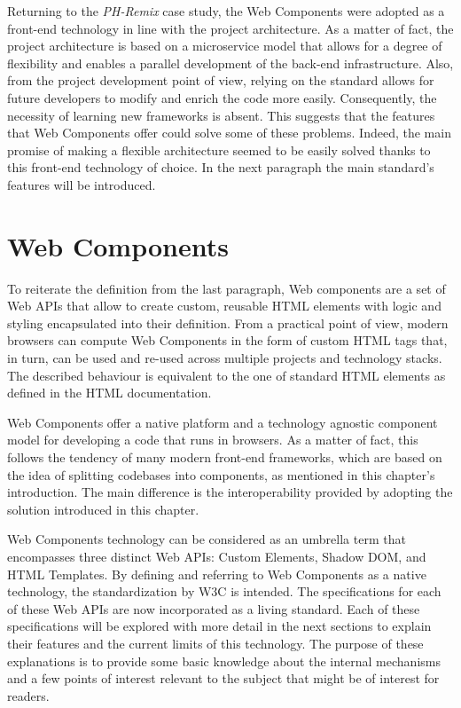 Returning to the \emph{PH-Remix} case study, the Web Components were adopted as a front-end technology in line with the project architecture. As a matter of fact, the project architecture is based on a microservice model that allows for a degree of flexibility and enables a parallel development of the back-end infrastructure. Also, from the project development point of view, relying on the standard allows for future developers to modify and enrich the code more easily. Consequently, the necessity of learning new frameworks is absent. This suggests that the features that Web Components offer could solve some of these problems. Indeed, the main promise of making a flexible architecture seemed to be easily solved thanks to this front-end technology of choice. In the next paragraph the main standard’s features will be introduced. 

\section{Web Components}
\label{sec:webComponents}

To reiterate the definition from the last paragraph, Web components are a set of Web APIs that allow to create custom, reusable HTML elements with logic and styling encapsulated into their definition. From a practical point of view, modern browsers can compute Web Components in the form of custom HTML tags that, in turn, can be used and re-used across multiple projects and technology stacks. The described behaviour is equivalent to the one of standard HTML elements as defined in the HTML documentation.

Web Components offer a native platform and a technology agnostic component model for developing a code that runs in browsers. As a matter of fact, this follows the tendency of many modern front-end frameworks, which are based on the idea of splitting codebases into components, as mentioned in this chapter’s introduction. The main difference is the interoperability provided by adopting the solution introduced in this chapter.

Web Components technology can be considered as an umbrella term that encompasses three distinct Web APIs: Custom Elements, Shadow DOM, and HTML Templates. By defining and referring to Web Components as a native technology, the standardization by W3C is intended. The specifications for each of these Web APIs are now incorporated as a living standard. Each of these specifications will be explored with more detail in the next sections to explain their features and the current limits of this technology. The purpose of these explanations is to provide some basic knowledge about the internal mechanisms and a few points of interest relevant to the subject that might be of interest for readers.

